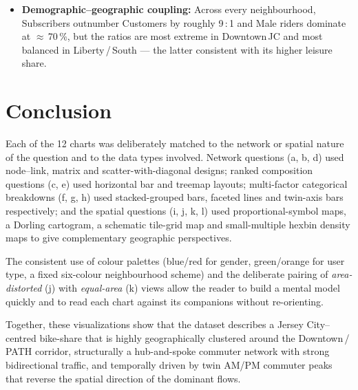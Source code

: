 \documentclass[11pt, a4paper]{article}
\begin{document}
\begin{itemize}
\item \textbf{Demographic--geographic coupling:} Across every neighbourhood, Subscribers outnumber Customers by roughly 9\,:\,1 and Male riders dominate at $\approx$\,70\,\%, but the ratios are most extreme in Downtown\,JC and most balanced in Liberty\,/\,South --- the latter consistent with its higher leisure share.
\end{itemize}

\section{Conclusion}

Each of the 12 charts was deliberately matched to the network or spatial nature of the question and to the data types involved. Network questions (a, b, d) used node--link, matrix and scatter-with-diagonal designs; ranked composition questions (c, e) used horizontal bar and treemap layouts; multi-factor categorical breakdowns (f, g, h) used stacked-grouped bars, faceted lines and twin-axis bars respectively; and the spatial questions (i, j, k, l) used proportional-symbol maps, a Dorling cartogram, a schematic tile-grid map and small-multiple hexbin density maps to give complementary geographic perspectives.

The consistent use of colour palettes (blue/red for gender, green/orange for user type, a fixed six-colour neighbourhood scheme) and the deliberate pairing of \emph{area-distorted} (j) with \emph{equal-area} (k) views allow the reader to build a mental model quickly and to read each chart against its companions without re-orienting.

Together, these visualizations show that the dataset describes a Jersey City--centred bike-share that is highly geographically clustered around the Downtown\,/\,PATH corridor, structurally a hub-and-spoke commuter network with strong bidirectional traffic, and temporally driven by twin AM/PM commuter peaks that reverse the spatial direction of the dominant flows.
\end{document}
